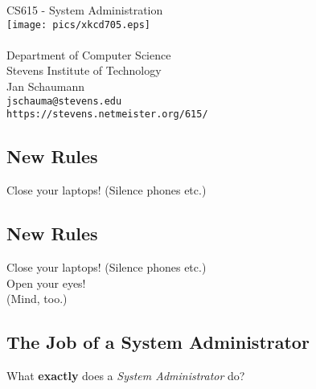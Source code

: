 \documentclass[xga]{xdvislides}
\begin{document}
\setfontphv

\lhead{\slidetitle}				%
\cfoot{\relax}					%
\rfoot{\Gray{\today}}

\vspace*{\fill}
\begin{center}
	\Hugesize
		CS615 - System Administration\\ [1em]
		\texttt{[image: pics/xkcd705.eps]} \\
	\hspace*{5mm}\blueline\\ [1em]
	\Normalsize
		Department of Computer Science\\
		Stevens Institute of Technology\\
		Jan Schaumann\\
		\verb+jschauma@stevens.edu+ \\
		\verb+https://stevens.netmeister.org/615/+
\end{center}
\vspace*{\fill}

\subsection{New Rules}
\Hugesize
\vspace*{\fill}
\begin{center}
Close your laptops! (Silence phones etc.)
\end{center}
\vspace*{\fill}
\Normalsize

\subsection{New Rules}
\Hugesize
\vspace*{\fill}
\begin{center}
Close your laptops! (Silence phones etc.) \\
\vspace{.5in}
Open your eyes! \\
\small
(Mind, too.)
\end{center}
\vspace*{\fill}
\Normalsize

\subsection{The Job of a System Administrator}
What {\bf exactly} does a {\em System Administrator} do?
\end{document}
